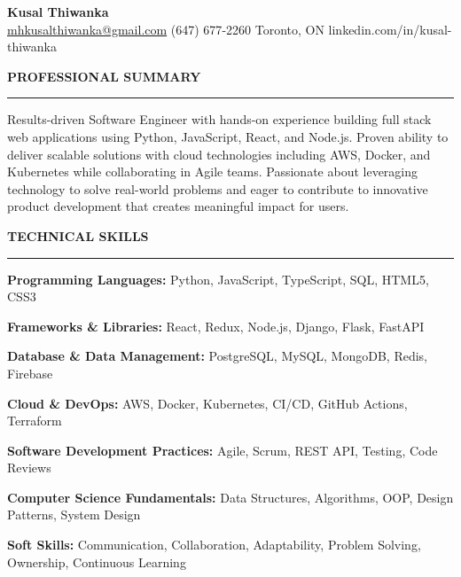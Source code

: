 \documentclass[10pt,letterpaper]{article}
\begin{document}
\begin{center}
{\LARGE\textbf{Kusal Thiwanka}}\\[3pt]
\href{mailto:mhkusalthiwanka@gmail.com}{mhkusalthiwanka@gmail.com}\hspace{2em}%
(647) 677{-}2260\hspace{2em}%
Toronto, ON\hspace{2em}
linkedin.com/in/kusal-thiwanka
\end{center}

\vspace{6pt}

\textbf{PROFESSIONAL SUMMARY}\\[-8pt]
\noindent\rule{\textwidth}{1pt}

\vspace{-2pt}

Results-driven Software Engineer with hands-on experience building full stack web applications using Python, JavaScript, React, and Node.js. Proven ability to deliver scalable solutions with cloud technologies including AWS, Docker, and Kubernetes while collaborating in Agile teams. Passionate about leveraging technology to solve real-world problems and eager to contribute to innovative product development that creates meaningful impact for users.

\vspace{8pt}

\textbf{TECHNICAL SKILLS}\\[-8pt]
\noindent\rule{\textwidth}{1pt}

\vspace{-2pt}

\textbf{Programming Languages:} Python, JavaScript, TypeScript, SQL, HTML5, CSS3

\textbf{Frameworks \& Libraries:} React, Redux, Node.js, Django, Flask, FastAPI

\textbf{Database \& Data Management:} PostgreSQL, MySQL, MongoDB, Redis, Firebase

\textbf{Cloud \& DevOps:} AWS, Docker, Kubernetes, CI/CD, GitHub Actions, Terraform

\textbf{Software Development Practices:} Agile, Scrum, REST API, Testing, Code Reviews

\textbf{Computer Science Fundamentals:} Data Structures, Algorithms, OOP, Design Patterns, System Design

\textbf{Soft Skills:} Communication, Collaboration, Adaptability, Problem Solving, Ownership, Continuous Learning
\end{document}
